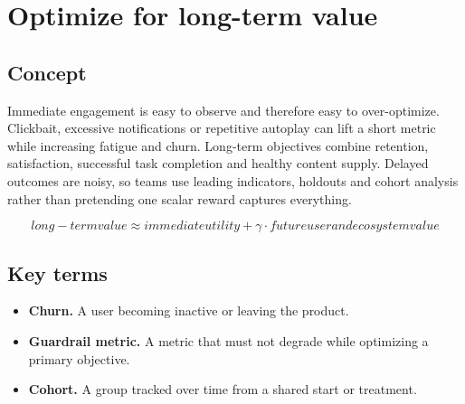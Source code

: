 \section{Optimize for long-term value}

\begin{abstract}
A policy can win the next click while quietly losing trust, retention or creator supply.
\end{abstract}

\subsection{Concept}
Immediate engagement is easy to observe and therefore easy to over-optimize. Clickbait, excessive notifications or repetitive autoplay can lift a short metric while increasing fatigue and churn. Long-term objectives combine retention, satisfaction, successful task completion and healthy content supply. Delayed outcomes are noisy, so teams use leading indicators, holdouts and cohort analysis rather than pretending one scalar reward captures everything.

\begin{equation*}
long-term value \approx immediate utility + γ \cdot future user and ecosystem value
\end{equation*}

\subsection{Key terms}
\begin{itemize}
\item \textbf{Churn.} A user becoming inactive or leaving the product.
\item \textbf{Guardrail metric.} A metric that must not degrade while optimizing a primary objective.
\item \textbf{Cohort.} A group tracked over time from a shared start or treatment.
\end{itemize}
